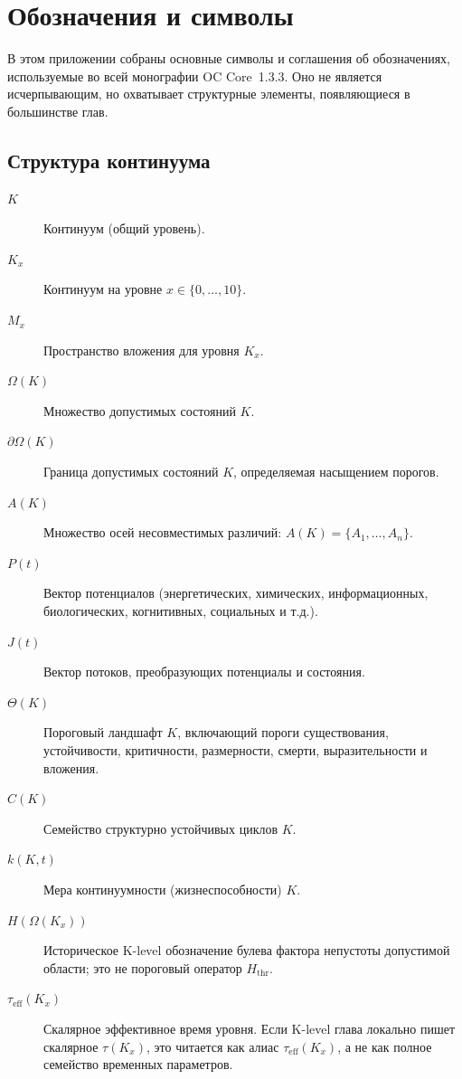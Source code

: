 \section{Обозначения и символы}
\label{app:notation}

В этом приложении собраны основные символы и соглашения об обозначениях, используемые
во всей монографии OC Core~1.3.3. Оно не является исчерпывающим, но охватывает
структурные элементы, появляющиеся в большинстве глав.

\subsection{Структура континуума}

\begin{description}
  \item[\(K\)] Континуум (общий уровень).
  \item[\(K_x\)] Континуум на уровне \(x\in\{0,\dots,10\}\).
  \item[\(M_x\)] Пространство вложения для уровня \(K_x\).
  \item[\(\Omega(K)\)] Множество допустимых состояний \(K\).
  \item[\(\partial\Omega(K)\)] Граница допустимых состояний \(K\), определяемая
        насыщением порогов.
  \item[\(A(K)\)] Множество осей несовместимых различий:
        \(A(K) = \{A_1,\dots,A_n\}\).
  \item[\(P(t)\)] Вектор потенциалов (энергетических, химических, информационных,
        биологических, когнитивных, социальных и т.д.).
  \item[\(J(t)\)] Вектор потоков, преобразующих потенциалы и состояния.
  \item[\(\Theta(K)\)] Пороговый ландшафт \(K\), включающий пороги существования,
        устойчивости, критичности, размерности, смерти, выразительности и
        вложения.
  \item[\(C(K)\)] Семейство структурно устойчивых циклов \(K\).
  \item[\(k(K,t)\)] Мера континуумности (жизнеспособности) \(K\).
  \item[\(H(\Omega(K_x))\)] Историческое K-level обозначение булева фактора
        непустоты допустимой области; это не пороговый оператор
        \(H_{\mathrm{thr}}\).
  \item[\(\tau_{\mathrm{eff}}(K_x)\)] Скалярное эффективное время уровня.
        Если K-level глава локально пишет скалярное \(\tau(K_x)\), это
        читается как алиас \(\tau_{\mathrm{eff}}(K_x)\), а не как полное
        семейство временных параметров.
\end{description}

